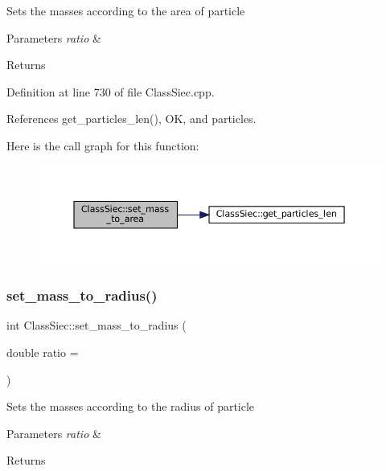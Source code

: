 Sets the masses according to the area of particle 
\begin{DoxyParams}{Parameters}
{\em ratio} & \\
\hline
\end{DoxyParams}
\begin{DoxyReturn}{Returns}

\end{DoxyReturn}


Definition at line 730 of file Class\+Siec.\+cpp.



References get\+\_\+particles\+\_\+len(), OK, and particles.

Here is the call graph for this function\+:
\nopagebreak
\begin{figure}[H]
\begin{center}
\leavevmode
\includegraphics[width=350pt]{classClassSiec_aa2eff85fe7fc842b2d0631118d533154_cgraph}
\end{center}
\end{figure}
\mbox{\label{classClassSiec_a361b139e9734e15599847d2060d85d6b}} 
\subsubsection{\texorpdfstring{set\+\_\+mass\+\_\+to\+\_\+radius()}{set\_mass\_to\_radius()}}
{\footnotesize\ttfamily int Class\+Siec\+::set\+\_\+mass\+\_\+to\+\_\+radius (\begin{DoxyParamCaption}\item[{double}]{ratio = {} }\end{DoxyParamCaption})}

Sets the masses according to the radius of particle 
\begin{DoxyParams}{Parameters}
{\em ratio} & \\
\hline
\end{DoxyParams}
\begin{DoxyReturn}{Returns}

\end{DoxyReturn}


